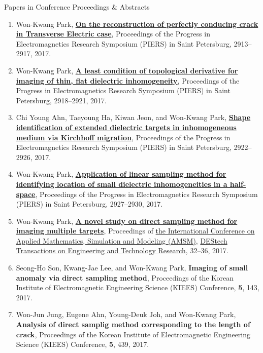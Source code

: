 \documentclass{resume} %
\begin{document}
\begin{rSection}{Papers in Conference Proceedings \& Abstracts}
\begin{enumerate}
\item\label{C-PIERS2017C} Won-Kwang Park, \href{https://doi.org/10.1109/PIERS.2017.8262252}{\textbf{On the reconstruction of perfectly conducing crack in Transverse Electric case}}, Proceedings of the Progress in Electromagnetics Research Symposium (PIERS) in Saint Petersburg, 2913--2917, 2017.
\item\label{C-PIERS2017D} Won-Kwang Park, \href{https://doi.org/10.1109/PIERS.2017.8262253}{\textbf{A least condition of topological derivative for imaging of thin, flat dielectric inhomogeneity}}, Proceedings of the Progress in Electromagnetics Research Symposium (PIERS) in Saint Petersburg, 2918--2921, 2017.
\item\label{C-PIERS2017A} Chi Young Ahn, Taeyoung Ha, Kiwan Jeon, and Won-Kwang Park, \href{https://doi.org/10.1109/PIERS.2017.8262254}{\textbf{Shape identification of extended dielectric targets in inhomogeneous medium via Kirchhoff migration}}, Proceedings of the Progress in Electromagnetics Research Symposium (PIERS) in Saint Petersburg, 2922--2926, 2017.
\item\label{C-PIERS2017E} Won-Kwang Park, \href{https://doi.org/10.1109/PIERS.2017.8262255}{\textbf{Application of linear sampling method for identifying location of small dielectric inhomogeneities in a half-space}}, Proceedings of the Progress in Electromagnetics Research Symposium (PIERS) in Saint Petersburg, 2927--2930, 2017.
\item\label{C-AMSM2017} Won-Kwang Park, \href{http://dx.doi.org/10.12783/dtetr/amsm2017/14814}{\textbf{A novel study on direct sampling method for imaging multiple targets}}, Proceedings of \href{http://www.amsm2017.org}{the  International Conference on Applied Mathematics, Simulation and Modeling (AMSM)}, \href{http://www.destechpub.com/product/destech-transactions-engineering-technology-research/}{DEStech Transactions on Engineering and Technology Research}, 32--36, 2017.
\item\label{C-KIEES2017A} Seong-Ho Son, Kwang-Jae Lee, and Won-Kwang Park, \textbf{Imaging of small anomaly via direct sampling method}, Proceedings of the Korean Institute of Electromagnetic Engineering Science (KIEES) Conference, \textbf{5}, 143, 2017.
\item\label{C-KIEES2017B} Won-Jun Jung, Eugene Ahn, Young-Deuk Joh, and Won-Kwang Park, \textbf{Analysis of direct samplig method corresponding to the length of crack}, Proceedings of the Korean Institute of Electromagnetic Engineering Science (KIEES) Conference, \textbf{5}, 439, 2017.

\end{enumerate}
\end{rSection}
\end{document}
